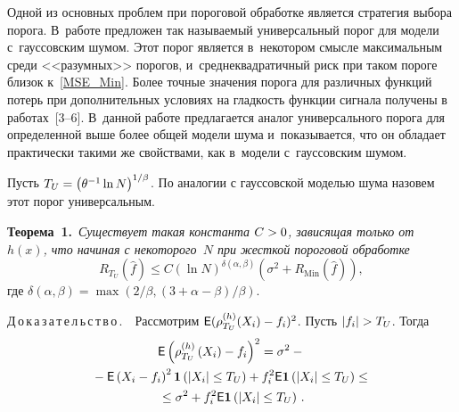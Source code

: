 \begin{multicols}{2}
\vspace*{-2pt}

Одной из основных проблем при пороговой обработке является стратегия выбора порога. 
В~работе \cite{DonJ94} предложен так называемый универсальный порог для модели 
с~гауссовским шумом. Этот порог является в~некотором смысле максимальным среди 
<<разумных>> порогов, и~среднеквадратичный риск при таком пороге близок 
к~\eqref{MSE_Min}. Более точные значения порога для различных функций потерь при 
дополнительных условиях на гладкость функции сигнала получены в работах~[3--6]. 
В~данной работе предлагается аналог универсального порога для определенной выше 
более общей модели шума и~показывается, что он обладает практически такими же 
свойствами, как в~модели с~гауссовским шумом.

Пусть $T_U\hm=\left(\theta^{-1}\ln N\right)^{1/\beta}$. 
По аналогии с гауссовской моделью шума назовем этот порог универсальным.

\smallskip

\noindent
\textbf{Теорема~1.}\ \textit{Существует такая константа $C\hm>0$, 
зависящая только от~$h(x)$, что начиная с некоторого~$N$ при жесткой пороговой 
обработке}
\begin{equation}
\label{MSE_Hard}
R_{T_U}\left(\hat{f}\right)\leq C(\ln N)^{\delta(\alpha,\beta)}
\left(\sigma^2+R_{\mathrm{Min}}\left(\hat{f}\right)\right),
\end{equation}
где $\delta(\alpha,\beta)=\max({2}/{\beta},({3+\alpha-\beta})/{\beta})$.

\columnbreak

\noindent
Д\,о\,к\,а\,з\,а\,т\,е\,л\,ь\,с\,т\,в\,о\,.\ \ 
Рассмотрим $\e(\rho_{T_U}^{(h)}(X_i)\hm-f_i)^2$. Пусть $\abs{f_i}\hm>T_U$. Тогда
\begin{multline*}
{\sf E}\left(\rho_{T_U}^{(h)}\left(X_i\right)-f_i\right)^2=\sigma^2-{}\\
{}-
{\sf E}\left(X_i-f_i\right)^2\mathbf{1}\left(\left\vert X_i\right\vert\leq T_U\right)+f_i^2{\sf E}\mathbf{1}
\left(\left\vert X_i\right\vert\leq T_U\right) \leq{}\\
{}\leq \sigma^2+f_i^2{\sf E}\mathbf{1}\left(\left\vert X_i\right\vert\leq T_U\right)\,.
\end{multline*}


\end{multicols}
